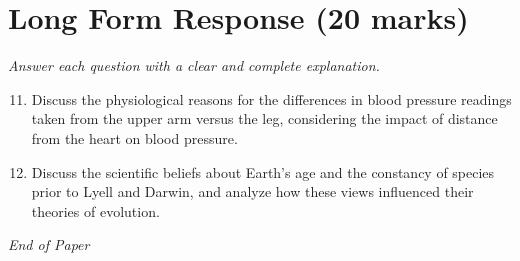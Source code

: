 \documentclass[12pt]{article}
\begin{document}
\section*{Long Form Response (20 marks)}
\textit{Answer each question with a clear and complete explanation.}
\begin{enumerate}[label=\arabic*.]
\setcounter{enumi}{10}
\item Discuss the physiological reasons for the differences in blood pressure readings taken from the upper arm versus the leg, considering the impact of distance from the heart on blood pressure.
\item Discuss the scientific beliefs about Earth's age and the constancy of species prior to Lyell and Darwin, and analyze how these views influenced their theories of evolution.
\end{enumerate}

\vfill
\noindent\textit{End of Paper}
\end{document}
